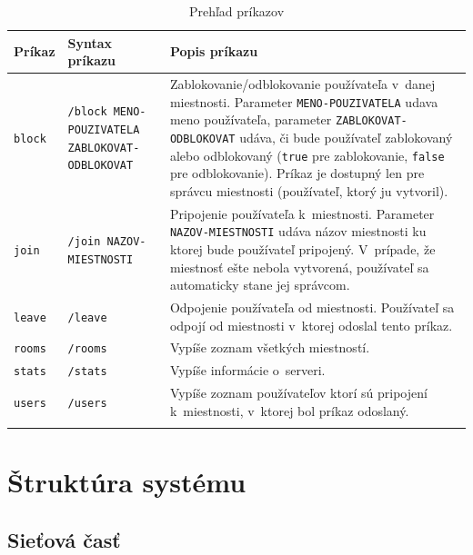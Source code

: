 \documentclass[11pt]{article}
\begin{document}
\begin{longtable}{p{1cm} p{5cm} p{7cm}}
	\toprule
	Príkaz & Syntax príkazu & Popis príkazu \\
	\midrule
	\texttt{block} & \texttt{/block MENO-POUZIVATELA ZABLOKOVAT-ODBLOKOVAT} &
	Zablokovanie/odblokovanie používateľa v~danej miestnosti. Parameter
	\texttt{MENO-POUZIVATELA} udava meno používateľa, parameter
	\texttt{ZABLOKOVAT-ODBLOKOVAT}
	udáva, či bude používateľ zablokovaný alebo odblokovaný (\texttt{true} pre
	zablokovanie, \texttt{false} pre odblokovanie). Príkaz je dostupný len pre
	správcu miestnosti (používateľ, ktorý ju vytvoril).\\

	\texttt{join} & \texttt{/join NAZOV-MIESTNOSTI} & Pripojenie používateľa
	k~miestnosti. Parameter \texttt{NAZOV-MIESTNOSTI} udáva názov miestnosti ku
	ktorej bude používateľ pripojený. V~prípade, že miestnosť ešte nebola
	vytvorená, používateľ sa automaticky stane jej správcom. \\

	\texttt{leave} & \texttt{/leave} & Odpojenie používateľa od miestnosti.
	Používateľ sa odpojí od miestnosti v~ktorej odoslal tento príkaz. \\

	\texttt{rooms} & \texttt{/rooms} & Vypíše zoznam všetkých miestností. \\

	\texttt{stats} & \texttt{/stats} & Vypíše informácie o~serveri. \\

	\texttt{users} & \texttt{/users} & Vypíše zoznam používateľov ktorí sú
	pripojení k~miestnosti, v~ktorej bol príkaz odoslaný. \\
	\bottomrule
	\caption{Prehľad príkazov}
	\label{tab:prikazy}
\end{longtable}

\pagebreak

\section{Štruktúra systému}

\subsection{Sieťová časť}
\end{document}
